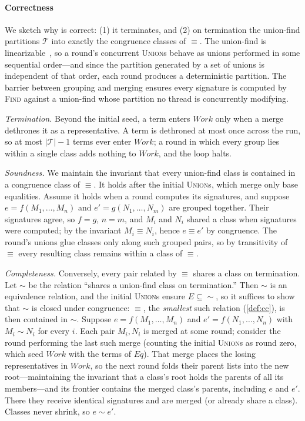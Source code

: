 \paragraph{Correctness} We sketch why \parentalgo{} is correct: (1) it
terminates, and (2) on termination the union-find partitions $\mathcal{T}$ into
exactly the congruence classes of $\equiv$. The union-find is
linearizable~\cite{uf}, so a round's concurrent \textsc{Union}s behave as
unions performed in some sequential order---and since the partition generated
by a set of unions is independent of that order, each round produces a
deterministic partition. The barrier between grouping and
merging ensures every signature is computed by \textsc{Find} against a
union-find whose partition no thread is concurrently modifying.

\emph{Termination.} Beyond the initial seed, a term enters $\mathit{Work}$
only when a merge dethrones it as a representative. A term is dethroned at
most once across the run, so at most $|\mathcal{T}|-1$ terms ever enter
$\mathit{Work}$; a round in which every group lies within a single class adds
nothing to $\mathit{Work}$, and the loop halts.

\emph{Soundness.} We maintain the invariant that every union-find class is
contained in a congruence class of $\equiv$. It holds after the initial
\textsc{Union}s, which merge only base equalities. Assume it holds when a round
computes its signatures, and suppose $e = f(M_1,\ldots,M_n)$ and
$e' = g(N_1,\ldots,N_m)$ are grouped together. Their signatures agree, so
$f = g$, $n = m$, and $M_i$ and $N_i$ shared a class when signatures were
computed; by the invariant $M_i \equiv N_i$, hence $e \equiv e'$ by congruence.
The round's unions glue classes only along such grouped pairs, so by
transitivity of $\equiv$ every resulting class remains within a class of
$\equiv$.

\emph{Completeness.} Conversely, every pair related by $\equiv$ shares a class
on termination. Let $\sim$ be the relation ``shares a union-find class on
termination.'' Then $\sim$ is an equivalence relation, and the initial
\textsc{Union}s ensure $E \subseteq {\sim}$, so it suffices to show that
$\sim$ is closed under congruence: $\equiv$, the \emph{smallest} such relation
(\autoref{def:cc}), is then contained in $\sim$. Suppose
$e = f(M_1,\ldots,M_n)$ and $e' = f(N_1,\ldots,N_n)$ with $M_i \sim N_i$ for
every $i$. Each pair $M_i, N_i$ is merged at some round; consider the round
performing the last such merge (counting the initial \textsc{Union}s as round
zero, which seed $\mathit{Work}$ with the terms of $\mathit{Eq}$). That merge
places the losing representatives in $\mathit{Work}$, so the next round folds
their parent lists into the new root---maintaining the invariant that a
class's root holds the parents of all its members---and its frontier contains
the merged class's parents, including $e$ and $e'$. There they receive
identical signatures and are merged (or already share a class). Classes never
shrink, so $e \sim e'$.


